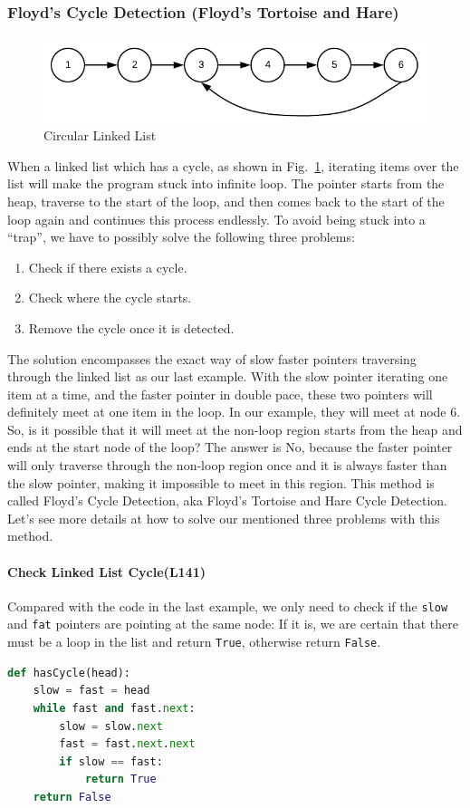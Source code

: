 \documentclass[../main.tex]{subfiles}
\begin{document}
\subsubsection{Floyd's Cycle Detection (Floyd's Tortoise and Hare)} 
\begin{figure}[h!]
    \centering
    \includegraphics[width=0.8\columnwidth]{fig/circular_linked_list.png}
    \caption{Circular Linked List}
    \label{fig:circular_linked_list}
\end{figure}
When a linked list which has a cycle, as shown in Fig.~\ref{fig:circular_linked_list}, iterating items over the list will make the program stuck into infinite loop. The pointer starts from the heap, traverse to the start of the loop, and then comes back to the start of the loop again and continues this process endlessly. To avoid being stuck into a ``trap'', we have to possibly solve the following three problems:
\begin{enumerate}
    \item Check if there exists a cycle. 
    \item Check where the cycle starts.
    \item Remove the cycle once it is detected.
\end{enumerate}
The solution encompasses the exact way of slow faster pointers traversing through the linked list as our last example. With the slow pointer iterating one item at a time, and the faster pointer in double pace, these two pointers will definitely meet at one item in the loop. In our example, they will meet at node 6. So, is it possible that it will meet at the non-loop region starts from the heap and ends at the start node of the loop? The answer is No, because the faster pointer will only traverse through the non-loop region once and it is always faster than the slow pointer, making it impossible to meet in this region.  This method is called Floyd's Cycle Detection, aka Floyd's Tortoise and Hare Cycle Detection. Let's see more details at how to solve our mentioned three problems with this method. 
\paragraph{Check Linked List Cycle(L141)}
Compared with the code in the last example, we only need to check if the \texttt{slow} and \texttt{fat} pointers are pointing at the same node: If it is, we are certain that there must be a loop in the list and return \texttt{True}, otherwise  return \texttt{False}.
\begin{lstlisting}[language=Python]
def hasCycle(head):
    slow = fast = head
    while fast and fast.next:
        slow = slow.next
        fast = fast.next.next
        if slow == fast:
            return True
    return False
\end{lstlisting}
\end{document}
